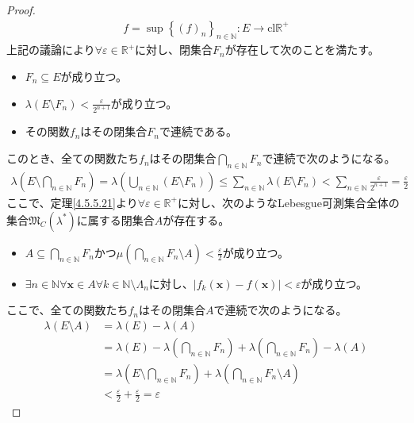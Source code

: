 \documentclass[dvipdfmx]{jsarticle}
\begin{document}
\begin{proof}
\begin{align*}
f = \sup\left\{ (f)_{n} \right\}_{n \in \mathbb{N}}:E \rightarrow \mathrm{cl}\mathbb{R}^{+}
\end{align*}
上記の議論により$\forall\varepsilon \in \mathbb{R}^{+}$に対し、閉集合$F_{n}$が存在して次のことを満たす。
\begin{itemize}
\item
  $F_{n} \subseteq E$が成り立つ。
\item
  $\lambda\left( E \setminus F_{n} \right) < \frac{\varepsilon}{2^{n + 1}}$が成り立つ。
\item
  その関数$f_{n}$はその閉集合$F_{n}$で連続である。
\end{itemize}
このとき、全ての関数たち$f_{n}$はその閉集合$\bigcap_{n \in \mathbb{N}} F_{n}$で連続で次のようになる。
\begin{align*}
\lambda\left( E \setminus \bigcap_{n \in \mathbb{N}} F_{n} \right) = \lambda\left( \bigcup_{n \in \mathbb{N}} \left( E \setminus F_{n} \right) \right) \leq \sum_{n \in \mathbb{N}} {\lambda\left( E \setminus F_{n} \right)} < \sum_{n \in \mathbb{N}} \frac{\varepsilon}{2^{n + 1}} = \frac{\varepsilon}{2}
\end{align*}
ここで、定理\ref{4.5.5.21}より$\forall\varepsilon \in \mathbb{R}^{+}$に対し、次のようなLebesgue可測集合全体の集合$\mathfrak{M}_{C}\left( \lambda^{*} \right)$に属する閉集合$A$が存在する。
\begin{itemize}
\item
  $A \subseteq \bigcap_{n \in \mathbb{N}} F_{n}$かつ$\mu\left( \bigcap_{n \in \mathbb{N}} F_{n} \setminus A \right) < \frac{\varepsilon}{2}$が成り立つ。
\item
  $\exists n \in \mathbb{N}\forall\mathbf{x} \in A\forall k \in \mathbb{N} \setminus \varLambda_{n}$に対し、$\left| f_{k}\left( \mathbf{x} \right) - f\left( \mathbf{x} \right) \right| < \varepsilon$が成り立つ。
\end{itemize}
ここで、全ての関数たち$f_{n}$はその閉集合$A$で連続で次のようになる。
\begin{align*}
\lambda(E \setminus A) &= \lambda(E) - \lambda(A)\\
&= \lambda(E) - \lambda\left( \bigcap_{n \in \mathbb{N}} F_{n} \right) + \lambda\left( \bigcap_{n \in \mathbb{N}} F_{n} \right) - \lambda(A)\\
&= \lambda\left( E \setminus \bigcap_{n \in \mathbb{N}} F_{n} \right) + \lambda\left( \bigcap_{n \in \mathbb{N}} F_{n} \setminus A \right)\\
&< \frac{\varepsilon}{2} + \frac{\varepsilon}{2} = \varepsilon

\end{align*}
\end{proof}
\end{document}
